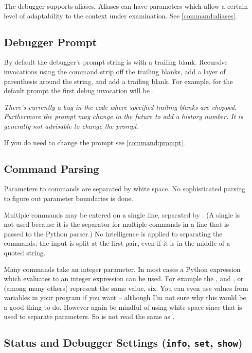 The debugger supports aliases.  Aliases can have parameters which
allow a certain level of adaptability to the context under
examination. See \ref{command:aliases}.

\subsection{Debugger Prompt}\label{debugger:prompt}

By default the debugger's prompt string is  with 
a trailing blank. Recursive invocations using the
 command strip off the trailing blanks, add a layer of
parenthesis around the string, and add a trailing blank. For example,
for the default prompt the first debug invocation will be
.

\emph{There's currently a bug in the code where specified trailing
blanks are chopped. Furthermore the prompt may change in the future to
add a history number. It is generally not advisable to change the
prompt.}

If you do need to change the prompt see \ref{command:prompt}.

\subsection{Command Parsing}
Parameters to commands are separated by white space. No sophisticated
parsing to figure out parameter boundaries is done.

Multiple commands may be entered on a single line, separated by
\samp{;;}.  (A single \samp{;} is not used because it is the separator
for multiple commands in a line that is passed to the Python parser.)
No intelligence is applied to separating the commands; the input is
split at the first \samp{;;} pair, even if it is in the middle of a
quoted string.

Many commands take an integer parameter. In most cases a Python
expression which evaluates to an integer expression can be used. For
example the ,  and , or 
(among many others) represent the same value, six. You can even use
values from variables in your program if you want -- although I'm not
sure why this would be a good thing to do. However again be mindful of
using white space since that is used to separate parameters. So
 is not read the same as .

\subsection{Status and Debugger Settings ({\tt info}, {\tt set}, {\tt show})\label{subsection-status}}

